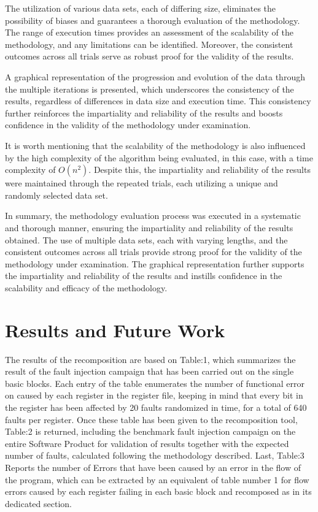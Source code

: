 \documentclass[./dissertation.tex]{subfiles}
\begin{document}
The utilization of various data sets, each of differing size, eliminates the possibility of biases and guarantees a thorough evaluation of the methodology. The range of execution times provides an assessment of the scalability of the methodology, and any limitations can be identified. Moreover, the consistent outcomes across all trials serve as robust proof for the validity of the results.

A graphical representation of the progression and evolution of the data through the multiple iterations is presented, which underscores the consistency of the results, regardless of differences in data size and execution time. This consistency further reinforces the impartiality and reliability of the results and boosts confidence in the validity of the methodology under examination.

It is worth mentioning that the scalability of the methodology is also influenced by the high complexity of the algorithm being evaluated, in this case, with a time complexity of $O(n^2)$. Despite this, the impartiality and reliability of the results were maintained through the repeated trials, each utilizing a unique and randomly selected data set.

In summary, the methodology evaluation process was executed in a systematic and thorough manner, ensuring the impartiality and reliability of the results obtained. The use of multiple data sets, each with varying lengths, and the consistent outcomes across all trials provide strong proof for the validity of the methodology under examination. The graphical representation further supports the impartiality and reliability of the results and instills confidence in the scalability and efficacy of the methodology.


\section{Results and Future Work}
The results of the recomposition are based on Table:1, which summarizes the result of the fault injection campaign that has been carried out on the single basic blocks. Each entry of the table enumerates the number of functional error on caused by each register in the register file, keeping in mind that every bit in the register has been affected by 20 faults randomized in time, for a total of 640 faults per register. Once these table has been given to the recomposition tool, Table:2 is returned, including the benchmark fault injection campaign on the entire Software Product for validation of results together with the expected number of faults, calculated following the methodology described. Last, Table:3 Reports the number of Errors that have been caused by an error in the flow of the program, which can be extracted by an equivalent of table number 1 for flow errors caused by each register failing in each basic block and recomposed as in its dedicated section.
\end{document}
